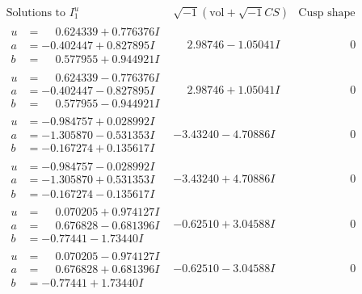 \documentclass[1p]{elsarticle_modified}
\theoremstyle{definition}
\newcommand{\I}{\sqrt{-1}}
\begin{document}
$$\begin{array}{c|c|c}  
\text{Solutions to }I^u_{1}& \I (\text{vol} + \sqrt{-1}CS) & \text{Cusp shape}\\
 \hline 
\begin{aligned}
u &= \phantom{-}0.624339 + 0.776376 I \\
a &= -0.402447 + 0.827895 I \\
b &= \phantom{-}0.577955 + 0.944921 I\end{aligned}
 & \phantom{-}2.98746 - 1.05041 I & \phantom{-0.000000 } 0 \\ \hline\begin{aligned}
u &= \phantom{-}0.624339 - 0.776376 I \\
a &= -0.402447 - 0.827895 I \\
b &= \phantom{-}0.577955 - 0.944921 I\end{aligned}
 & \phantom{-}2.98746 + 1.05041 I & \phantom{-0.000000 } 0 \\ \hline\begin{aligned}
u &= -0.984757 + 0.028992 I \\
a &= -1.305870 - 0.531353 I \\
b &= -0.167274 + 0.135617 I\end{aligned}
 & -3.43240 - 4.70886 I & \phantom{-0.000000 } 0 \\ \hline\begin{aligned}
u &= -0.984757 - 0.028992 I \\
a &= -1.305870 + 0.531353 I \\
b &= -0.167274 - 0.135617 I\end{aligned}
 & -3.43240 + 4.70886 I & \phantom{-0.000000 } 0 \\ \hline\begin{aligned}
u &= \phantom{-}0.070205 + 0.974127 I \\
a &= \phantom{-}0.676828 - 0.681396 I \\
b &= -0.77441 - 1.73440 I\end{aligned}
 & -0.62510 + 3.04588 I & \phantom{-0.000000 } 0 \\ \hline\begin{aligned}
u &= \phantom{-}0.070205 - 0.974127 I \\
a &= \phantom{-}0.676828 + 0.681396 I \\
b &= -0.77441 + 1.73440 I\end{aligned}
 & -0.62510 - 3.04588 I & \phantom{-0.000000 } 0 \\ \hline\begin{aligned}

\end{aligned}
\end{array}$$
\end{document}
